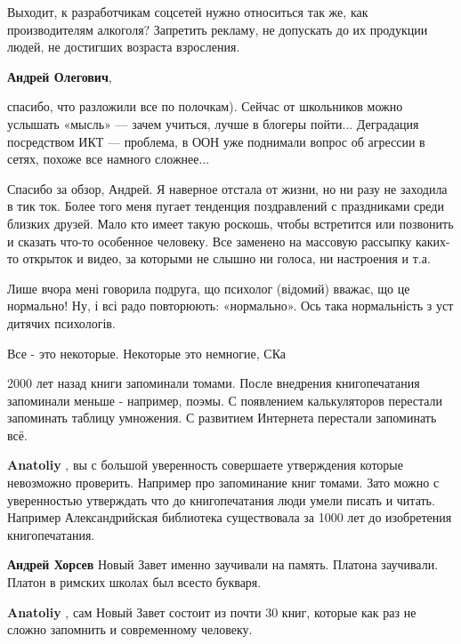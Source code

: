 \begin{itemize}

Выходит, к разработчикам соцсетей нужно относиться так же, как производителям
алкоголя? Запретить рекламу, не допускать до их продукции людей, не достигших
возраста взросления.


\textbf{Андрей Олегович}, 

спасибо, что разложили все по полочкам). Сейчас от школьников можно услышать
«мысль» — зачем учиться, лучше в блогеры пойти... Деградация посредством ИКТ —
проблема, в ООН уже поднимали вопрос об агрессии в сетях, похоже все намного
сложнее...


Спасибо за обзор, Андрей. Я наверное отстала от жизни, но ни разу не заходила в
тик ток. Более того меня пугает тенденция поздравлений с праздниками среди
близких друзей. Мало кто имеет такую роскошь, чтобы встретится или позвонить и
сказать что-то особенное человеку. Все заменено на массовую рассыпку каких-то
открыток и видео, за которыми не слышно ни голоса, ни настроения и т.а.


Лише вчора мені говорила подруга, що психолог (відомий) вважає, що це
нормально! Ну, і всі радо повторюють: «нормально». Ось така нормальність з уст
дитячих психологів.

Все - это некоторые. Некоторые это немногие, СКа


2000 лет назад книги запоминали томами. После внедрения книгопечатания
запоминали меньше - например, поэмы. С появлением калькуляторов перестали
запоминать таблицу умножения. С развитием Интернета перестали запоминать всё.

\begin{itemize} %
\textbf{Anatoliy} , вы с большой уверенность совершаете утверждения которые невозможно проверить.
Например про запоминание книг томами.
Зато можно с уверенностью утверждать что до книгопечатания люди умели писать и читать.
Например Александрийская библиотека существовала за 1000 лет до изобретения книгопечатания.

\textbf{Андрей Хорсев} Новый Завет именно заучивали на память. Платона заучивали. Платон в римских школах был всесто букваря.

\textbf{Anatoliy} , сам Новый Завет состоит из почти 30 книг, которые как раз не сложно запомнить и современному человеку.
\end{itemize} %


\end{itemize}
